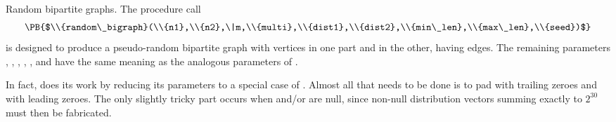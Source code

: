 Random bipartite graphs. The procedure call
$$\hbox{\PB{$\\{random\_bigraph}(\\{n1},\\{n2},\|m,\\{multi},\\{dist1},%
\\{dist2},\\{min\_len},\\{max\_len},\\{seed})$}}$$
is designed to produce a pseudo-random bipartite graph
with  vertices in one part and  in the other, having  edges.
The remaining parameters , , , , ,
and  have the same meaning as the analogous parameters of .

In fact,  does its work by reducing its parameters
to a special case of . Almost all that needs to be done
is
to pad  with  trailing zeroes and  with %
 leading
zeroes. The only slightly tricky part occurs when  and/or  are
null, since non-null distribution vectors summing exactly to $2^{30}$ must then
be fabricated.

